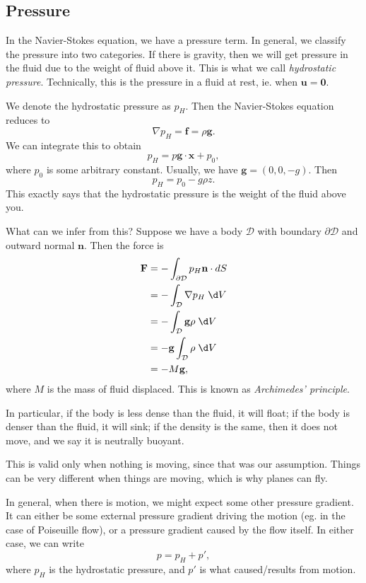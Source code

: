 \documentclass[a4paper]{article}
\begin{document}
\subsection{Pressure}
In the Navier-Stokes equation, we have a pressure term. In general, we classify the pressure into two categories. If there is gravity, then we will get pressure in the fluid due to the weight of fluid above it. This is what we call \emph{hydrostatic pressure}. Technically, this is the pressure in a fluid at rest, ie. when $\mathbf{u} = \mathbf{0}$.

 We denote the hydrostatic pressure as $p_H$. Then the Navier-Stokes equation reduces to
\[
  \nabla p_H = \mathbf{f} = \rho \mathbf{g}.
\]
We can integrate this to obtain
\[
  p_H = p \mathbf{g}\cdot \mathbf{x} + p_0,
\]
where $p_0$ is some arbitrary constant. Usually, we have $\mathbf{g} = (0, 0, -g)$. Then
\[
  p_H = p_0 - g \rho z.
\]
This exactly says that the hydrostatic pressure is the weight of the fluid above you.

What can we infer from this? Suppose we have a body $\mathcal{D}$ with boundary $\partial \mathcal{D}$ and outward normal $\mathbf{n}$. Then the force is
\begin{align*}
  \mathbf{F} &= - \int_{\partial \mathcal{D}} p_H \mathbf{n}\cdot dS \\
  &= - \int_\mathcal{D} \nabla p_H \;\d V\\
  &= - \int_{\mathcal{D}} \mathbf{g} \rho \;\d V\\
  &= - \mathbf{g} \int_\mathcal{D} \rho \;\d V\\
  &= - M\mathbf{g},
\end{align*}
where $M$ is the mass of fluid displaced. This is known as \emph{Archimedes' principle}.

In particular, if the body is less dense than the fluid, it will float; if the body is denser than the fluid, it will sink; if the density is the same, then it does not move, and we say it is neutrally buoyant.

This is valid only when nothing is moving, since that was our assumption. Things can be very different when things are moving, which is why planes can fly.

In general, when there is motion, we might expect some other pressure gradient. It can either be some external pressure gradient driving the motion (eg. in the case of Poiseuille flow), or a pressure gradient caused by the flow itself. In either case, we can write
\[
  p = p_H + p',
\]
where $p_H$ is the hydrostatic pressure, and $p'$ is what caused/results from motion.
\end{document}
